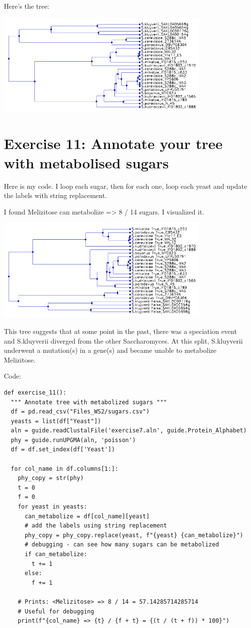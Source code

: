 \documentclass{article} %
\begin{document}
Here's the tree:

\includegraphics[width=0.8\textwidth]{tree.png}

\section{Exercise 11: Annotate your tree with metabolised sugars}

Here is my code. I loop each sugar, then for each one, loop each yeast and update the labels with string replacement.

I found Melizitose can metabolize => 8 / 14 sugars. I visualized it.

\includegraphics[width=0.8\textwidth]{tree2.png}

This tree suggests that at some point in the past, there was a speciation event and S.kluyverii diverged from the other Saccharomyces. At this split, S.kluyverii underwent a mutation(s) in a gene(s) and became unable to metabolize Melizitose.

Code:

\begin{verbatim}
def exercise_11():
  """ Annotate tree with metabolized sugars """
  df = pd.read_csv("Files_WS2/sugars.csv")
  yeasts = list(df["Yeast"])                        
  aln = guide.readClustalFile('exercise7.aln', guide.Protein_Alphabet)
  phy = guide.runUPGMA(aln, 'poisson')
  df = df.set_index(df['Yeast'])

  for col_name in df.columns[1:]:
    phy_copy = str(phy)
    t = 0
    f = 0
    for yeast in yeasts:
      can_metabolize = df[col_name][yeast]
      # add the labels using string replacement
      phy_copy = phy_copy.replace(yeast, f"{yeast} {can_metabolize}")
      # debugging - can see how many sugars can be metabolized
      if can_metabolize: 
        t += 1
      else:
        f += 1

    # Prints: <Melizitose> => 8 / 14 = 57.14285714285714
    # Useful for debugging
    print(f"{col_name} => {t} / {f + t} = {(t / (t + f)) * 100}")
\end{verbatim}
\end{document}
